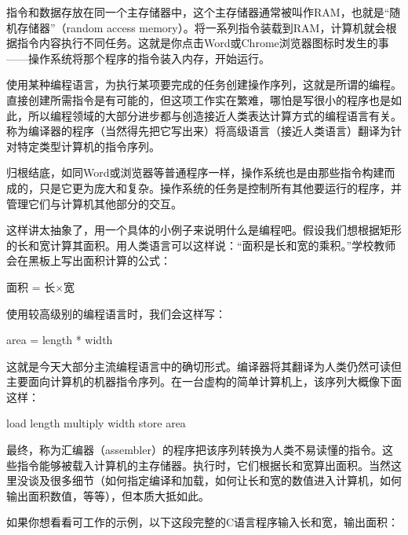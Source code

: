 \documentclass[a4paper,12pt,UTF8,twoside]{ctexbook}
\begin{document}
指令和数据存放在同一个主存储器中，这个主存储器通常被叫作RAM，也就是“随机存储器”（random access memory）。将一系列指令装载到RAM，计算机就会根据指令内容执行不同任务。这就是你点击Word或Chrome浏览器图标时发生的事——操作系统将那个程序的指令装入内存，开始运行。

使用某种编程语言，为执行某项要完成的任务创建操作序列，这就是所谓的编程。直接创建所需指令是有可能的，但这项工作实在繁难，哪怕是写很小的程序也是如此，所以编程领域的大部分进步都与创造接近人类表达计算方式的编程语言有关。称为编译器的程序（当然得先把它写出来）将高级语言（接近人类语言）翻译为针对特定类型计算机的指令序列。

归根结底，如同Word或浏览器等普通程序一样，操作系统也是由那些指令构建而成的，只是它更为庞大和复杂。操作系统的任务是控制所有其他要运行的程序，并管理它们与计算机其他部分的交互。

这样讲太抽象了，用一个具体的小例子来说明什么是编程吧。假设我们想根据矩形的长和宽计算其面积。用人类语言可以这样说：“面积是长和宽的乘积。”学校教师会在黑板上写出面积计算的公式：

面积 = 长×宽

使用较高级别的编程语言时，我们会这样写：

area = length * width

这就是今天大部分主流编程语言中的确切形式。编译器将其翻译为人类仍然可读但主要面向计算机的机器指令序列。在一台虚构的简单计算机上，该序列大概像下面这样：

load length multiply width store area

最终，称为汇编器（assembler）的程序把该序列转换为人类不易读懂的指令。这些指令能够被载入计算机的主存储器。执行时，它们根据长和宽算出面积。当然这里没谈及很多细节（如何指定编译和加载，如何让长和宽的数值进入计算机，如何输出面积数值，等等），但本质大抵如此。

如果你想看看可工作的示例，以下这段完整的C语言程序输入长和宽，输出面积：
\end{document}
